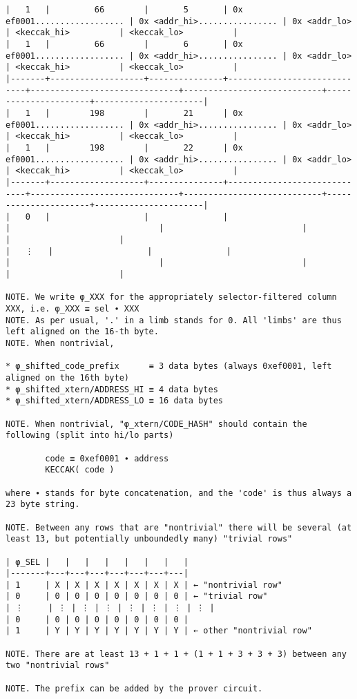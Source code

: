 \documentclass[varwidth=\maxdimen,margin=0.5cm,multi={verbatim}]{standalone}
\begin{document}
\begin{verbatim}
|   1   |         66        |       5       | 0x ef0001.................. | 0x <addr_hi>................ | 0x <addr_lo>               | <keccak_hi>          | <keccak_lo>          |
|   1   |         66        |       6       | 0x ef0001.................. | 0x <addr_hi>................ | 0x <addr_lo>               | <keccak_hi>          | <keccak_lo>          |
|-------+-------------------+---------------+-----------------------------+------------------------------+----------------------------+----------------------+----------------------|
|   1   |        198        |       21      | 0x ef0001.................. | 0x <addr_hi>................ | 0x <addr_lo>               | <keccak_hi>          | <keccak_lo>          |
|   1   |        198        |       22      | 0x ef0001.................. | 0x <addr_hi>................ | 0x <addr_lo>               | <keccak_hi>          | <keccak_lo>          |
|-------+-------------------+---------------+-----------------------------+------------------------------+----------------------------+----------------------+----------------------|
|   0   |                   |               |                             |                              |                            |                      |                      |
|   ⋮   |                   |               |                             |                              |                            |                      |                      |

NOTE. We write φ_XXX for the appropriately selector-filtered column XXX, i.e. φ_XXX ≡ sel ∙ XXX
NOTE. As per usual, '.' in a limb stands for 0. All 'limbs' are thus left aligned on the 16-th byte.
NOTE. When nontrivial,

* φ_shifted_code_prefix      ≡ 3 data bytes (always 0xef0001, left aligned on the 16th byte)
* φ_shifted_xtern/ADDRESS_HI ≡ 4 data bytes
* φ_shifted_xtern/ADDRESS_LO ≡ 16 data bytes

NOTE. When nontrivial, "φ_xtern/CODE_HASH" should contain the following (split into hi/lo parts)

        code ≡ 0xef0001 ∙ address
        KECCAK( code )

where ∙ stands for byte concatenation, and the 'code' is thus always a 23 byte string.

NOTE. Between any rows that are "nontrivial" there will be several (at least 13, but potentially unboundedly many) "trivial rows"

| φ_SEL |   |   |   |   |   |   |   |
|-------+---+---+---+---+---+---+---|
| 1     | X | X | X | X | X | X | X | ← "nontrivial row"
| 0     | 0 | 0 | 0 | 0 | 0 | 0 | 0 | ← "trivial row"
| ⋮     | ⋮ | ⋮ | ⋮ | ⋮ | ⋮ | ⋮ | ⋮ |
| 0     | 0 | 0 | 0 | 0 | 0 | 0 | 0 |
| 1     | Y | Y | Y | Y | Y | Y | Y | ← other "nontrivial row"

NOTE. There are at least 13 + 1 + 1 + (1 + 1 + 3 + 3 + 3) between any two "nontrivial rows"

NOTE. The prefix can be added by the prover circuit.

\end{verbatim}
\end{document}
